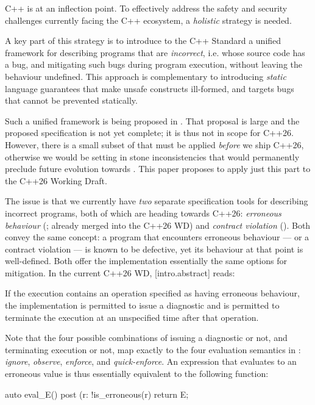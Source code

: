 C++ is at an inflection point. To effectively address the safety and security challenges currently facing the C++ ecosystem, a \emph{holistic} strategy is needed.

A key part of this strategy is to introduce to the C++ Standard a unified framework for describing programs that are \emph{incorrect}, i.e. whose source code has a bug, and mitigating such bugs during program execution, without leaving the behaviour undefined. This approach is complementary to introducing \emph{static} language guarantees that make unsafe constructs ill-formed, and targets bugs that cannot be prevented statically.

Such a unified framework is being proposed in \cite{P3100R1}. That proposal is large and the proposed specification is not yet complete; it is thus not in scope for C++26. However, there is a small subset of \cite{P3100R1} that must be applied \emph{before} we ship C++26, otherwise we would be setting in stone inconsistencies that would permanently preclude future evolution towards \cite{P3100R1}. This paper proposes to apply just this part to the C++26 Working Draft.

The issue is that we currently have \emph{two} separate specification tools for describing incorrect programs, both of which are heading towards C++26: \emph{erroneous behaviour} (\cite{P2795R5}; already merged into the C++26 WD) and \emph{contract violation} (\cite{P2900R13}). Both convey the same concept: a program that encounters erroneous behaviour --- or a contract violation --- is known to be defective, yet its behaviour at that point is well-defined. Both offer the implementation essentially the same options for mitigation. In the current C++26 WD, [intro.abstract] reads:
\begin{adjustwidth}{0.5cm}{0.5cm}
If the execution contains an operation specified as having erroneous behaviour, the implementation is permitted to issue a diagnostic and is permitted to terminate the execution at an unspecified time after that operation.
\end{adjustwidth}
Note that the four possible combinations of issuing a diagnostic or not, and terminating execution or not, map exactly to the four evaluation semantics in \cite{P2900R13}: \emph{ignore}, \emph{observe}, \emph{enforce}, and \emph{quick-enforce}. An expression  that evaluates to an erroneous value is thus essentially equivalent to the following function:

\begin{codeblock}
auto eval_E() 
post (r: !is_erroneous(r) { 
  return E;
}
\end{codeblock}

